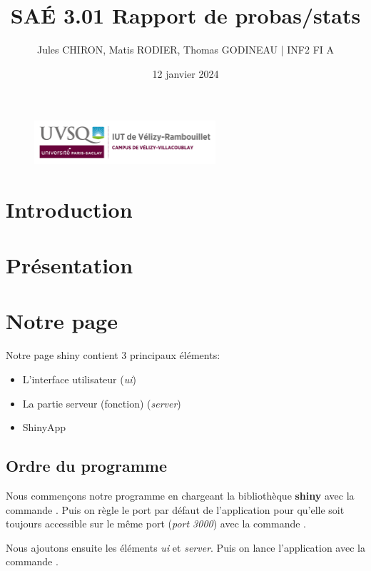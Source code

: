 \documentclass[12pt, a4paper]{article}
\title{SAÉ 3.01 Rapport de probas/stats}
\author{Jules CHIRON, Matis RODIER, Thomas GODINEAU | INF2 FI A}
\date{12 janvier 2024}
\begin{document}
\maketitle

\begin{figure}[h]
    \includegraphics[width=0.6\textwidth]{../annexes/logo_uvsq}
\end{figure}

\tableofcontents{}

\section*{Introduction}

\section{Présentation}

\section{Notre page}

Notre page shiny contient 3 principaux éléments:
\begin{itemize}
    \item L'interface utilisateur (\textit{ui})
    \item La partie serveur (fonction) (\textit{server})
    \item ShinyApp
\end{itemize}

\subsection*{Ordre du programme}

Nous commençons notre programme en chargeant la bibliothèque \textbf{shiny} avec la commande .
Puis on règle le port par défaut de l'application pour qu'elle soit toujours accessible sur le même port (\textit{port 3000})
avec la commande .
\bigskip

Nous ajoutons ensuite les éléments \textit{ui} et \textit{server}.
Puis on lance l'application avec la commande .
\end{document}
